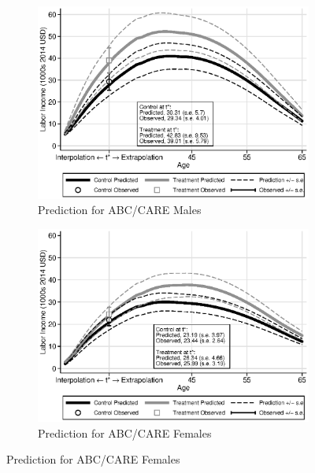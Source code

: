 \begin{figure}
\centering
\caption{Labor Income Profile Predictions}\label{fig:labor-income-profiles}
\begin{subfigure}[h]{0.5\textwidth}
		\centering
		\caption{Prediction for ABC/CARE Males} \label{fig:labor-income-profilesc}
		\includegraphics[width=\textwidth]{output/labor_25-65_pset1_mset3_male.eps}
\end{subfigure}%
\begin{subfigure}[h]{0.5\textwidth}
		\centering
		\caption{Prediction for ABC/CARE Females} \label{fig:labor-income-profilesa}
		\includegraphics[width=\textwidth]{output/labor_25-65_pset1_mset3_female.eps}
\end{subfigure}
\footnotesize \justify

\end{figure}
